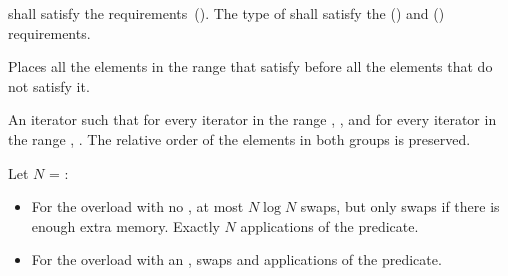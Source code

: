\begin{itemdescr}
\pnum
\requires
{} shall satisfy the
 requirements~(). The type
of  shall satisfy the
 () and
 () requirements.

\pnum
\effects
Places all the elements in the range
that satisfy  before all the
elements that do not satisfy it.

\pnum
\returns
An iterator
such that for every iterator
in the range
,
,
and for every iterator
in the range
,
.
The relative order of the elements in both groups is preserved.

\pnum
\complexity
Let $N$ = :
\begin{itemize}
\item For the overload with no , at most $N \log N$ swaps,
but only  swaps if there is enough extra memory.  Exactly $N$
applications of the predicate.
\item For the overload with an ,
 swaps and  applications of the predicate.
\end{itemize}
\end{itemdescr}

